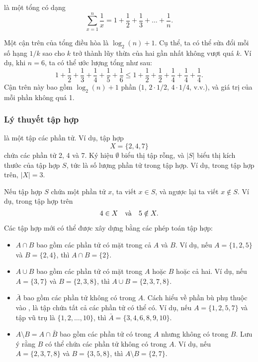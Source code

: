 
 là một tổng có dạng
\[ \sum_{x=1}^n \frac{1}{x} = 1+\frac{1}{2}+\frac{1}{3}+\ldots+\frac{1}{n}.\]

Một cận trên của tổng điều hòa là $\log_2(n)+1$.
Cụ thể, ta có thể
sửa đổi mỗi số hạng $1/k$ sao cho $k$ trở thành
lũy thừa của hai gần nhất không vượt quá $k$.
Ví dụ, khi $n=6$, ta có thể ước lượng
tổng như sau:
\[ 1+\frac{1}{2}+\frac{1}{3}+\frac{1}{4}+\frac{1}{5}+\frac{1}{6} \le
1+\frac{1}{2}+\frac{1}{2}+\frac{1}{4}+\frac{1}{4}+\frac{1}{4}.\]
Cận trên này bao gồm $\log_2(n)+1$ phần
($1$, $2 \cdot 1/2$, $4 \cdot 1/4$, v.v.),
và giá trị của mỗi phần không quá 1.

\subsubsection{Lý thuyết tập hợp}


 là một tập các phần tử.
Ví dụ, tập hợp
\[X=\{2,4,7\}\]
chứa các phần tử 2, 4 và 7.
Ký hiệu $\emptyset$ biểu thị tập rỗng,
và $|S|$ biểu thị kích thước của tập hợp $S$,
tức là số lượng phần tử trong tập hợp.
Ví dụ, trong tập hợp trên, $|X|=3$.

Nếu tập hợp $S$ chứa một phần tử $x$,
ta viết $x \in S$,
và ngược lại ta viết $x \notin S$.
Ví dụ, trong tập hợp trên
\[4 \in X \hspace{10px}\textrm{và}\hspace{10px} 5 \notin X.\]

\begin{samepage}
Các tập hợp mới có thể được xây dựng bằng các phép toán tập hợp:
\begin{itemize}
\item {} $A \cap B$ bao gồm các phần tử
có mặt trong cả $A$ và $B$.
Ví dụ, nếu $A=\{1,2,5\}$ và $B=\{2,4\}$,
thì $A \cap B = \{2\}$.
\item {} $A \cup B$ bao gồm các phần tử
có mặt trong $A$ hoặc $B$ hoặc cả hai.
Ví dụ, nếu $A=\{3,7\}$ và $B=\{2,3,8\}$,
thì $A \cup B = \{2,3,7,8\}$.
\item {} $\bar A$ bao gồm các phần tử
không có trong $A$.
Cách hiểu về phần bù phụ thuộc vào
, là tập chứa tất cả các phần tử có thể có.
Ví dụ, nếu $A=\{1,2,5,7\}$ và tập vũ trụ là
$\{1,2,\ldots,10\}$, thì $\bar A = \{3,4,6,8,9,10\}$.
\item {} $A \setminus B = A \cap \bar B$
bao gồm các phần tử có trong $A$ nhưng không có trong $B$.
Lưu ý rằng $B$ có thể chứa các phần tử không có trong $A$.
Ví dụ, nếu $A=\{2,3,7,8\}$ và $B=\{3,5,8\}$,
thì $A \setminus B = \{2,7\}$.
\end{itemize}
\end{samepage}

